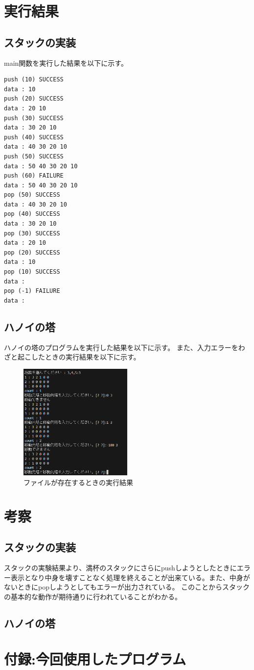 \documentclass[dvipdfmx]{jsarticle}
\begin{document}
\section{実行結果}
\subsection{スタックの実装}
main関数を実行した結果を以下に示す。
\begin{verbatim}
push (10) SUCCESS
data : 10 
push (20) SUCCESS
data : 20 10 
push (30) SUCCESS
data : 30 20 10 
push (40) SUCCESS
data : 40 30 20 10 
push (50) SUCCESS
data : 50 40 30 20 10 
push (60) FAILURE
data : 50 40 30 20 10 
pop (50) SUCCESS
data : 40 30 20 10 
pop (40) SUCCESS
data : 30 20 10 
pop (30) SUCCESS
data : 20 10 
pop (20) SUCCESS
data : 10 
pop (10) SUCCESS
data : 
pop (-1) FAILURE
data : 
\end{verbatim}
\subsection{ハノイの塔}
ハノイの塔のプログラムを実行した結果を以下に示す。
また、入力エラーをわざと起こしたときの実行結果を以下に示す。
\begin{figure}[ht]
  \centering
  \includegraphics[width=0.5\textwidth]{./txt/image.png}
  \caption{ファイルが存在するときの実行結果}
\end{figure}
\newpage

\section{考察}
\subsection{スタックの実装}
スタックの実験結果より、満杯のスタックにさらにpushしようとしたときにエラー表示となり中身を壊すことなく処理を終えることが出来ている。また、中身がないときにpopしようとしてもエラーが出力されている。
このことからスタックの基本的な動作が期待通りに行われていることがわかる。
\subsection{ハノイの塔}

\section{付録:今回使用したプログラム}


\end{document}
